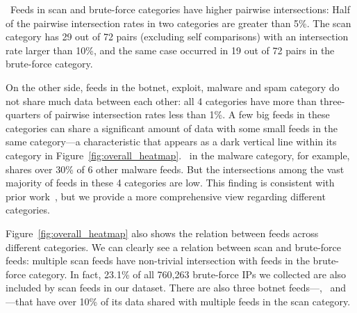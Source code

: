 \finding\ Feeds in scan and brute-force categories have higher pairwise intersections: Half of the pairwise intersection rates in two categories are greater than 5\%. The scan category has 29 out of 72 pairs (excluding self comparisons) with an intersection rate larger than 10\%, and the same case occurred in 19 out of 72 pairs in the brute-force category.

On the other side, feeds in the botnet, exploit, malware and spam category do not share much data between each other: all 4 categories have more than three-quarters of pairwise intersection rates less than 1\%. A few big feeds in these categories can share a significant amount of data with some small feeds in the same category---a characteristic that appears as a dark vertical line within its category in Figure~\ref{fig:overall_heatmap}. \feedetiprep\ in the malware category, for example, shares over 30\% of 6 other malware feeds. But the intersections among the vast majority of feeds in these 4 categories are low. This finding is consistent with prior work~\cite{metcalf2015blacklist,thomas2016abuse}, but we provide a more comprehensive view regarding different categories.

Figure~\ref{fig:overall_heatmap} also shows the relation between feeds across different categories. We can clearly see a relation between scan and brute-force feeds: multiple scan feeds have non-trivial intersection with feeds in the brute-force category. In fact, 23.1\% of all 760,263 brute-force IPs we collected are also included by scan feeds in our dataset. There are also three botnet feeds---\feedTSCI, \feedTSVoIP\ and \feedTSCompr---that have over 10\% of its data shared with multiple feeds in the scan category.

